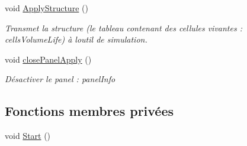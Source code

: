 \begin{DoxyCompactItemize}
void \mbox{\hyperlink{class_edit_mode_manager_ac1d4e4f292d17b4364054f05ddc13bee}{Apply\+Structure}} ()
\begin{DoxyCompactList}\small\item\em Transmet la structure (le tableau contenant des cellules vivantes \+: cells\+Volume\+Life) à l\textquotesingle{}outil de simulation. \end{DoxyCompactList}\item 
void \mbox{\hyperlink{class_edit_mode_manager_ad6ef0af559103e1ec43cf0b393bef83c}{close\+Panel\+Apply}} ()
\begin{DoxyCompactList}\small\item\em Désactiver le panel \+: panel\+Info \end{DoxyCompactList}\end{DoxyCompactItemize}
\subsection*{Fonctions membres privées}
\begin{DoxyCompactItemize}
\item 
void \mbox{\hyperlink{class_edit_mode_manager_a4f5385630cfd8a65e1aac37f79b4f8d3}{Start}} ()
\end{DoxyCompactItemize}
